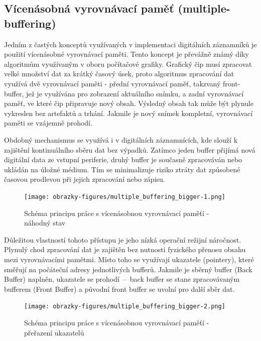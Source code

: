 \subsection{Vícenásobná vyrovnávací paměť (multiple-buffering)}
Jedním z častých konceptů využívaných v implementaci digitálních záznamníků je použití vícenásobné vyrovnávací paměti. Tento koncept je převážně známý díky algoritmům využívaným v oboru počítačové grafiky. Grafický čip musí zpracovat velké množství dat za krátký časový úsek, proto algoritmus zpracování dat využívá dvě vyrovnávací paměti - přední vyrovnávací paměť, takzvaný front-buffer, jež je využívána pro zobrazení aktuálního snímku, a zadní vyrovnávací paměť, ve které čip připravuje nový obsah. Výsledný obsah tak může být plynule vykreslen bez artefaktů a trhání. Jakmile je nový snímek kompletní, vyrovnávací paměti se vzájemně prohodí. \cite{double_buffering_model}

Obdobný mechanismus se využívá i v digitálních záznamnících, kde slouží k zajištění kontinuálního sběru dat bez výpadků. Zatímco jeden buffer přijímá nová digitální data ze vstupní periferie, druhý buffer je současně zpracováván nebo ukládán na úložné médium. Tím se minimalizuje riziko ztráty dat způsobené časovou prodlevou při jejich zpracování nebo zápisu.

\begin{figure}[h]
    \centering
    \texttt{[image: obrazky-figures/multiple\_buffering\_bigger-1.png]}
    
    \caption{Schéma principu práce s vícenásobnou vyrovnávací paměťí - náhodný stav}
    \label{fig:multiple-buffering-1}
\end{figure}

Důležitou vlastností tohoto přístupu je jeho nízká operační režijní náročnost. Plynulý chod zpracování dat je zajištěn bez nutnosti fyzického přenosu obsahu mezi vyrovnávacími pamětmi. Místo toho se využívají ukazatele (pointery), které směřují na počáteční adresy jednotlivých bufferů. Jakmile je sběrný buffer (Back Buffer) naplněn, ukazatele se prohodí~–~back buffer se stane zpracovávaným bufferem (Front Buffer) a původní front buffer se uvolní pro další sběr dat.

\begin{figure}[h]
    \centering
    \texttt{[image: obrazky-figures/multiple\_buffering\_bigger-2.png]}
    
    \caption{Schéma principu práce s vícenásobnou vyrovnávací paměťí - přeřazení ukazatelů}
    \label{fig:multiple-buffering-2}
\end{figure}


